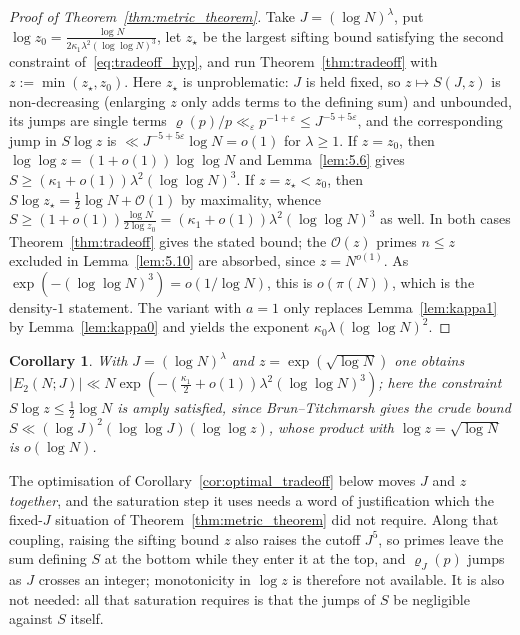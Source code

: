 \documentclass[11pt, a4paper]{article}
\theoremstyle{plain}
\newtheorem{corollary}[theorem]{Corollary}
\theoremstyle{definition}
\begin{document}
\begin{proof}[Proof of Theorem~\ref{thm:metric_theorem}]
Take $J=(\log N)^{\lambda}$, put $\log z_0=\frac{\log N}{2\kappa_1\lambda^{2}(\log\log N)^{3}}$, let $z_\star$ be the largest sifting bound satisfying the second constraint of~\eqref{eq:tradeoff_hyp}, and run Theorem~\ref{thm:tradeoff} with $z:=\min(z_\star,z_0)$. Here $z_\star$ is unproblematic: $J$ is held fixed, so $z\mapsto S(J,z)$ is non-decreasing (enlarging $z$ only adds terms to the defining sum) and unbounded, its jumps are single terms $\varrho(p)/p\ll_\varepsilon p^{-1+\varepsilon}\le J^{-5+5\varepsilon}$, and the corresponding jump in $S\log z$ is $\ll J^{-5+5\varepsilon}\log N=o(1)$ for $\lambda\ge1$. If $z=z_0$, then $\log\log z=(1+o(1))\log\log N$ and Lemma~\ref{lem:5.6} gives $S\ge(\kappa_1+o(1))\lambda^{2}(\log\log N)^{3}$. If $z=z_\star<z_0$, then $S\log z_\star=\frac12\log N+\mathcal{O}(1)$ by maximality, whence $S\ge(1+o(1))\frac{\log N}{2\log z_0}=(\kappa_1+o(1))\lambda^{2}(\log\log N)^{3}$ as well. In both cases Theorem~\ref{thm:tradeoff} gives the stated bound; the $\mathcal{O}(z)$ primes $n\le z$ excluded in Lemma~\ref{lem:5.10} are absorbed, since $z=N^{o(1)}$. As $\exp(-(\log\log N)^{3})=o(1/\log N)$, this is $o(\pi(N))$, which is the density-$1$ statement. The variant with $a=1$ only replaces Lemma~\ref{lem:kappa1} by Lemma~\ref{lem:kappa0} and yields the exponent $\kappa_0\lambda(\log\log N)^{2}$.
\end{proof}

\begin{corollary}\label{cor:conservative_z}
With $J=(\log N)^{\lambda}$ and $z=\exp(\sqrt{\log N})$ one obtains $|E_2(N;J)|\ll N\exp(-(\frac{\kappa_1}{2}+o(1))\lambda^{2}(\log\log N)^{3})$; here the constraint $S\log z\le\frac12\log N$ is amply satisfied, since Brun--Titchmarsh gives the crude bound $S\ll(\log J)^{2}(\log\log J)(\log\log z)$, whose product with $\log z=\sqrt{\log N}$ is $o(\log N)$.
\end{corollary}

The optimisation of Corollary~\ref{cor:optimal_tradeoff} below moves $J$ and $z$ \emph{together}, and the saturation step it uses needs a word of justification which the fixed-$J$ situation of Theorem~\ref{thm:metric_theorem} did not require. Along that coupling, raising the sifting bound $z$ also raises the cutoff $J^{5}$, so primes leave the sum defining $S$ at the bottom while they enter it at the top, and $\varrho_J(p)$ jumps as $J$ crosses an integer; monotonicity in $\log z$ is therefore not available. It is also not needed: all that saturation requires is that the jumps of $S$ be negligible against $S$ itself.
\end{document}
